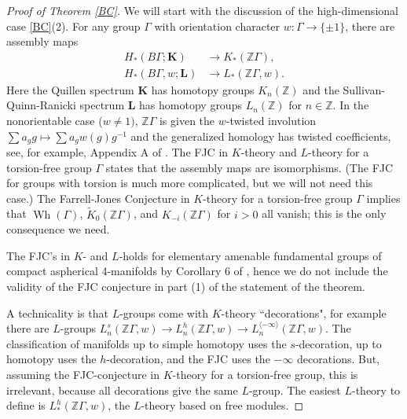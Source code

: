 \documentclass[12pt]{amsart}
\theoremstyle{definition}
\newcommand{\g}{\Gamma}
\newcommand{\Z}{\mathbb Z}
\DeclareMathOperator{\Wh}{Wh}
\newcommand{\wt}[1]{{\widetilde{#1}}}
\newcommand{\bfK}{\mathbf K}
\newcommand{\bfL}{\mathbf L}
\begin{document}
\begin{proof}[Proof of Theorem \ref{BC}]  We will start with the discussion of the high-dimensional case \ref{BC}(2).  
For any group $\g$ with orientation character $w : \g \to \{\pm 1 \}$, there are assembly maps
\begin{align*}
H_*(B\g; \bfK) & \to K_*(\Z \g), \\
H_*(B\g,w; \bfL) & \to L_*(\Z \g,w).
\end{align*}
Here the Quillen spectrum $\bfK$ has homotopy groups $K_n(\Z)$ and the Sullivan-Quinn-Ranicki spectrum $\bfL$ has homotopy groups $L_n(\Z)$ for $n \in \Z$.  In the nonorientable case ($w \not = 1)$, $\Z \g$ is given the $w$-twisted involution $\sum a_g g \mapsto \sum a_g w(g) g^{-1}$ and the generalized homology has twisted coefficients, see, for example, Appendix A of \cite{R92}.
The FJC in $K$-theory and $L$-theory for a torsion-free group $\g$ states that the assembly maps are isomorphisms.   (The FJC for groups with torsion is much more complicated, but we will not need this case.)   The Farrell-Jones Conjecture in $K$-theory for a torsion-free group $\g$ implies that $\Wh(\g)$, $\wt K_0(\Z\g)$, and $K_{-i}(\Z\g)$ for $i >0$ all vanish; this is the only consequence we need.

The FJC's in $K$- and $L$-holds for elementary amenable fundamental groups of compact aspherical 4-manifolds by Corollary 6 of \cite{DH2}, hence we do not include the validity of the FJC conjecture in part (1) of the statement of the theorem.  

A technicality is that $L$-groups come with $K$-theory ``decorations", for example there are $L$-groups $L_n^s(\Z \g,w) \to L^h_n(\Z \g,w) \to L^{\langle - \infty \rangle}_n(\Z \g,w)$.   The classification of manifolds up to simple homotopy uses the $s$-decoration, up to homotopy uses the $h$-decoration, and the FJC uses the $-\infty$ decorations.    But, assuming the FJC-conjecture in $K$-theory for a torsion-free group, this is irrelevant, because all decorations give the same $L$-group.   The easiest $L$-theory to define is $L^h_*(\Z \g,w)$, the $L$-theory based on free modules.   


\end{proof}
\end{document}
